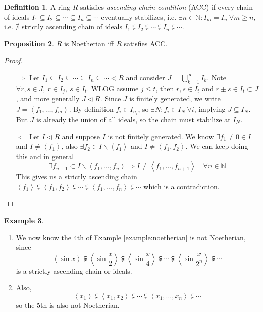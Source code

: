 \documentclass[a4paper]{article}
\newcommand{\la}{\left\langle}
\newcommand{\ra}{\right\rangle}
\theoremstyle{definition}
\newtheorem{defn}{Definition}[subsection]
\newtheorem{prop}[defn]{Proposition}
\newtheorem{example}[defn]{Example}
\begin{document}
\begin{defn}
A ring $R$ satisfies \textit{ascending chain condition} (ACC) if every chain of ideals $I_1\subseteq I_2\subseteq \cdots \subseteq I_n\subseteq \cdots$ eventually stabilizes, i.e. $\exists n\in\mathbb N:I_m=I_n \ \forall m\geq n$, i.e. $\nexists$ strictly ascending chain of ideals $I_1\subsetneqq I_2\subsetneqq \cdots \subsetneqq I_n \subsetneqq \cdots$.
\end{defn}
\begin{prop}
$R$ is Noetherian iff $R$ satisfies ACC.
\end{prop}
\begin{proof}
\begin{itemize}
\item[$\Rightarrow$] Let $I_1\subseteq I_2\subseteq \cdots \subseteq I_n\subseteq \cdots \lhd R$ and consider $J=\bigcup_{k=1}^\infty I_k$. Note $\forall r,s\in J,\ r\in I_j,\ s\in I_t$. WLOG assume $j\leq t$, then $r,s\in I_t$ and $r\pm s\in I_t\subset J$, and more generally $J\lhd R$. Since $J$ is finitely generated, we write $J=\la f_1,\ldots,f_m\ra$. By definition $f_i\in I_{n_i}$, so $\exists N:f_i\in I_N \ \forall i$, implying $J\subseteq I_N$. But $J$ is already the union of all ideals, so the chain must stabilize at $I_N$.

\item[$\Leftarrow$] Let $I\lhd R$ and suppose $I$ is not finitely generated. We know $\exists f_1\neq 0\in I$ and $I\neq \la f_1\ra$, also $\exists f_2\in I\backslash \la f_1\ra$ and $I\neq \la f_1,f_2\ra$. We can keep doing this and in general
\[
\exists f_{n+1}\subset I\backslash \la f_1,\ldots,f_n\ra \Rightarrow I\neq \la f_1,\ldots,f_{n+1}\ra \quad \forall n\in \mathbb N
\]
This gives us a strictly ascending chain $\la f_1\ra \subsetneqq \la f_1,f_2\ra \subsetneqq \cdots \subsetneqq \la f_1,\ldots,f_n\ra \subsetneqq \cdots$ which is a contradiction.
\end{itemize}
\end{proof}
\begin{example}
\begin{enumerate}
\item We now know the 4th of Example \ref{example:noetherian} is not Noetherian, since
\[
\la \sin x\ra \subsetneqq \la \sin \frac{x}{2}\ra \subsetneqq \la \sin \frac{x}{4}\ra \subsetneqq \cdots \subsetneqq \la \sin \frac{x}{2^n}\ra \subsetneqq \cdots
\]
is a strictly ascending chain or ideals.
\item Also,
\[
\la x_1\ra \subsetneqq \la x_1,x_2\ra \subsetneqq \cdots\subsetneqq \la x_1,\ldots,x_n\ra \subsetneqq \cdots
\]
so the 5th is also not Noetherian.
\end{enumerate}
\end{example}
\end{document}
